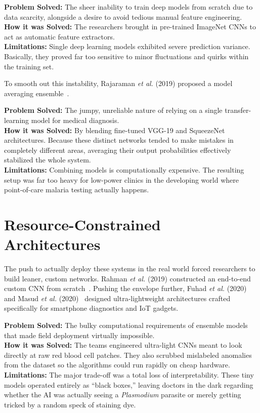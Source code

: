 \documentclass[conference]{IEEEtran}
\begin{document}
\textbf{Problem Solved:} The sheer inability to train deep models from scratch due to
data scarcity, alongside a desire to avoid tedious manual feature engineering.\\
\textbf{How it was Solved:} The researchers brought in pre-trained ImageNet CNNs to
act as automatic feature extractors.\\
\textbf{Limitations:} Single deep learning models exhibited severe prediction
variance. Basically, they proved far too sensitive to minor fluctuations and quirks
within the training set.

To smooth out this instability, Rajaraman \emph{et al.} (2019) proposed a model
averaging ensemble~\cite{rajaraman2019}.

\textbf{Problem Solved:} The jumpy, unreliable nature of relying on a single
transfer-learning model for medical diagnosis.\\
\textbf{How it was Solved:} By blending fine-tuned VGG-19 and SqueezeNet
architectures. Because these distinct networks tended to make mistakes in completely
different areas, averaging their output probabilities effectively stabilized the whole
system.\\
\textbf{Limitations:} Combining models is computationally expensive. The resulting
setup was far too heavy for low-power clinics in the developing world where
point-of-care malaria testing actually happens.

\section{Resource-Constrained Architectures}
The push to actually deploy these systems in the real world forced researchers to
build leaner, custom networks. Rahman \emph{et al.} (2019) constructed an end-to-end
custom CNN from scratch~\cite{rahman2019}. Pushing the envelope further, Fuhad
\emph{et al.} (2020)~\cite{fuhad2020} and Masud \emph{et al.} (2020)~\cite{masud2020}
designed ultra-lightweight architectures crafted specifically for smartphone
diagnostics and IoT gadgets.

\textbf{Problem Solved:} The bulky computational requirements of ensemble models that
made field deployment virtually impossible.\\
\textbf{How it was Solved:} The teams engineered ultra-light CNNs meant to look
directly at raw red blood cell patches. They also scrubbed mislabeled anomalies from
the dataset so the algorithms could run rapidly on cheap hardware.\\
\textbf{Limitations:} The major trade-off was a total loss of interpretability. These
tiny models operated entirely as ``black boxes,'' leaving doctors in the dark
regarding whether the AI was actually seeing a \emph{Plasmodium} parasite or merely
getting tricked by a random speck of staining dye.
\end{document}
